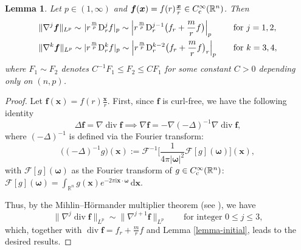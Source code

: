 \documentclass[11pt,reqno]{amsart}
\DeclareMathOperator{\diver}{\mathrm{div}}
\newtheorem{lem}{Lemma}[section]
\numberwithin{rk}{section}
\numberwithin{prop}{section}
\numberwithin{mydef}{section}
\numberwithin{lem}{section}
\numberwithin{equation}{section}
\numberwithin{thm}{section}
\begin{document}
\begin{lem}\label{im-1}
Let $p\in(1,\infty)$ and $\boldsymbol{f}(\boldsymbol{x})=f(r)\frac{\boldsymbol{x}}{r} \in C_{\rm c}^\infty(\mathbb{R}^n)$. 
Then 
\begin{equation*}
\begin{aligned}
&\|\nabla^j\boldsymbol{f}\|_{L^p} \sim \hspace{0.3mm}|r^\frac{m}{p}\mathrm{D}_r^jf|_{p}\sim \Big|r^\frac{m}{p}\mathrm{D}_r^{j-1}\big(f_r+\frac{m}{r}f\big)\Big|_{p}\quad&&\text{for $j=1,2$},\\
&\|\nabla^k\boldsymbol{f}\|_{L^p}\sim |r^\frac{m}{p}\mathrm{D}_r^kf|_{p} \sim \Big|r^\frac{m}{p}\mathrm{D}_r^{k-2}\big(f_r+\frac{m}{r}f\big)_r \Big|_p\quad&&\text{for $k=3,4$},
\end{aligned}
\end{equation*}
where $F_1\sim F_2$ denotes $C^{-1}F_1\leq F_2\leq CF_1$ for some constant $C>0$ depending only on $(n,p)$. 
\end{lem}
\begin{proof}
Let $\boldsymbol{f}(\boldsymbol{x})=f(r)\frac{\boldsymbol{x}}{r}$. First, since $\boldsymbol{f}$ is curl-free, we have the following identity 
\begin{equation*}
\Delta \boldsymbol{f} = \nabla\diver\boldsymbol{f}\implies \nabla \boldsymbol{f}= -\nabla(-\Delta)^{-1}\nabla\diver \boldsymbol{f},
\end{equation*}
where $(-\Delta)^{-1}$ is defined via the Fourier transform: 
\begin{equation*}
\big((-\Delta)^{-1}g\big)(\boldsymbol{x})
:=\mathcal{F}^{-1}\big[\frac{1}{4\pi|\boldsymbol{\omega}|^2}\mathcal{F}[g](\boldsymbol{\omega})\big] (\boldsymbol{x}),
\end{equation*}
with $\mathcal{F}[g](\boldsymbol{\omega})$ as
the Fourier transform of $g\in C^\infty_{\rm c}(\mathbb{R}^n)$: $\mathcal{F}[g](\boldsymbol{\omega})=\int_{\mathbb{R}^n} g(\boldsymbol{x})e^{-2\pi\mathrm{i}\boldsymbol{x}\cdot\boldsymbol{\omega}}\,\mathrm{d}\boldsymbol{x}$.
 

Thus, by the Mihlin--H\"ormander multiplier theorem (see \cite[Theorem 6.2.7]{lg}), we have 
\begin{equation*} 
\|\nabla^j\diver\boldsymbol{f}\|_{L^p}\sim\|\nabla^{j+1}\boldsymbol{f}\|_{L^p}\qquad \text{for integer $0\leq j\leq 3$},
\end{equation*}
which, together with $\diver\boldsymbol{f}=f_r+\frac{m}{r}f$ and  Lemma \ref{lemma-initial}, leads to the desired results. 
\end{proof}
\end{document}
